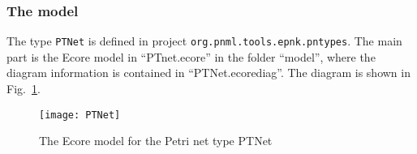 \subsubsection{The model}
\label{subsubsec:PNTD-model}
The type {\tt PTNet} is defined in project {\tt org.pnml.tools.epnk.pntypes}.
The main part is the Ecore
model in ``PTnet.ecore'' in the folder ``model'', where the diagram 
information is contained in ``PTNet.ecorediag''.
The diagram is shown in Fig.~\ref{fig:PTNetPNTD}.

\begin{figure}[hbt!!]
  \centerline{\texttt{[image: PTNet]}}
  \caption{The Ecore model for the Petri net type PTNet}
  \label{fig:PTNetPNTD}
\end{figure}

